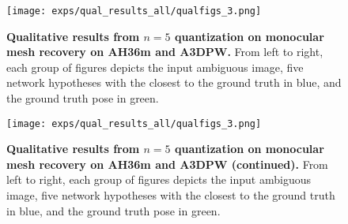\begin{figure}[t]
\def\topbtm{5cm}
\centering
\texttt{[image: exps/qual\_results\_all/qualfigs\_3.png]}

\caption{%
    \textbf{Qualitative results from $n=5$ quantization on monocular mesh recovery on AH36m and A3DPW.} 
    From left to right, each group of figures depicts the input ambiguous image, five network hypotheses with the closest to the ground truth in blue, and the ground truth pose in green.
    }\label{fig:qual_results_all}
\end{figure}


\begin{figure}[t]
\centering
\texttt{[image: exps/qual\_results\_all/qualfigs\_3.png]}
\caption{%
    \textbf{Qualitative results from $n=5$ quantization on monocular mesh recovery on AH36m and A3DPW (continued).} 
    From left to right, each group of figures depicts the input ambiguous image, five network hypotheses with the closest to the ground truth in blue, and the ground truth pose in green.
    }\label{fig:qual_results_all2}
\end{figure}